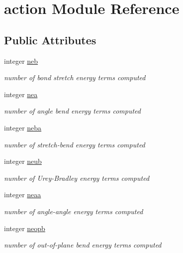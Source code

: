 \hypertarget{classaction}{\section{action Module Reference}
\label{classaction}
}
\subsection*{Public Attributes}
\begin{DoxyCompactItemize}
\item 
integer \hyperlink{classaction_a2dba92353771ac9ebf606dc123bd88d1}{neb}
\begin{DoxyCompactList}\small\item\em number of bond stretch energy terms computed \end{DoxyCompactList}\item 
integer \hyperlink{classaction_a55f3179dc359874a80270c8c5076dcaa}{nea}
\begin{DoxyCompactList}\small\item\em number of angle bend energy terms computed \end{DoxyCompactList}\item 
integer \hyperlink{classaction_ac2ad49a38672c2696b5cfc769b6cb4dd}{neba}
\begin{DoxyCompactList}\small\item\em number of stretch-\/bend energy terms computed \end{DoxyCompactList}\item 
integer \hyperlink{classaction_a44a0c39774e3630bcb60654dfea00b58}{neub}
\begin{DoxyCompactList}\small\item\em number of Urey-\/\-Bradley energy terms computed \end{DoxyCompactList}\item 
integer \hyperlink{classaction_a5d5f8160a0e42d793a8db7781e1bbdd8}{neaa}
\begin{DoxyCompactList}\small\item\em number of angle-\/angle energy terms computed \end{DoxyCompactList}\item 
integer \hyperlink{classaction_a7bdab54cdcfeeecc02ccc52a6b12257c}{neopb}
\begin{DoxyCompactList}\small\item\em number of out-\/of-\/plane bend energy terms computed \end{DoxyCompactList}\item 

\end{DoxyCompactItemize}

